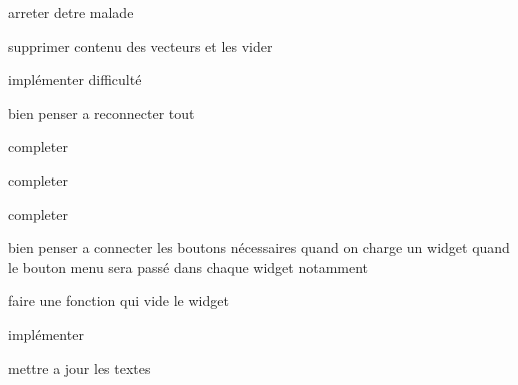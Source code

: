 \begin{DoxyRefList}
arreter d\textquotesingle{}etre malade  
\item[\label{todo__todo000013}%
\Hypertarget{todo__todo000013}%
Member \hyperlink{class_mod_memory_a77d39288e861c84edcfa760170fbc44d}{Mod\+Memory\+:\+:$\sim$\+Mod\+Memory} ()]supprimer contenu des vecteurs et les vider  
\item[\label{todo__todo000019}%
\Hypertarget{todo__todo000019}%
Member \hyperlink{class_mod_simon_a01de269fc7beadbe1199c233ba24ada4}{Mod\+Simon\+:\+:ini\+Score\+To\+Reach} (void)]implémenter difficulté  
\item[\label{todo__todo000026}%
\Hypertarget{todo__todo000026}%
Member \hyperlink{class_robin_main_window_a0850e17ae24394b14eb2dcfc4f15eeca}{Robin\+Main\+Window\+:\+:back\+To\+Menu} (void)]bien penser a reconnecter tout  
\item[\label{todo__todo000023}%
\Hypertarget{todo__todo000023}%
Member \hyperlink{class_robin_main_window_a55e49d0a4d727066b553fc2277dd8a78}{Robin\+Main\+Window\+:\+:open\+Calcul} (void)]completer  
\item[\label{todo__todo000025}%
\Hypertarget{todo__todo000025}%
Member \hyperlink{class_robin_main_window_aaf62641d678eb0f8829a2fb9c513ae68}{Robin\+Main\+Window\+:\+:open\+Memory} (void)]completer  
\item[\label{todo__todo000024}%
\Hypertarget{todo__todo000024}%
Member \hyperlink{class_robin_main_window_ab00b403de3169493a08c53f5d623ce6b}{Robin\+Main\+Window\+:\+:open\+Simon} (void)]completer  
\item[\label{todo__todo000021}%
\Hypertarget{todo__todo000021}%
Member \hyperlink{class_robin_main_window_a55f7775f5daefb2099a51e97d50df666}{Robin\+Main\+Window\+:\+:Robin\+Main\+Window} (Q\+Widget $\ast$parent=0)]bien penser a connecter les boutons nécessaires quand on charge un widget quand le bouton menu sera passé dans chaque widget notamment  
\item[\label{todo__todo000022}%
\Hypertarget{todo__todo000022}%
Member \hyperlink{class_robin_main_window_a72eb8450efc1dfe22e2f36c7f728c5f3}{Robin\+Main\+Window\+:\+:$\sim$\+Robin\+Main\+Window} ()]faire une fonction qui vide le widget  
\item[\label{todo__todo000027}%
\Hypertarget{todo__todo000027}%
Member \hyperlink{class_super_simon_af00408823847e80a511019baa536afb3}{Super\+Simon\+:\+:edit\+Sequence} (void)]implémenter  
\item[\label{todo__todo000028}%
\Hypertarget{todo__todo000028}%
Member \hyperlink{class_super_simon_a8d5c23562cd6b048720003d3c796ac7a}{Super\+Simon\+:\+:update\+View\+Simon} (void)]mettre a jour les textes 
\end{DoxyRefList}